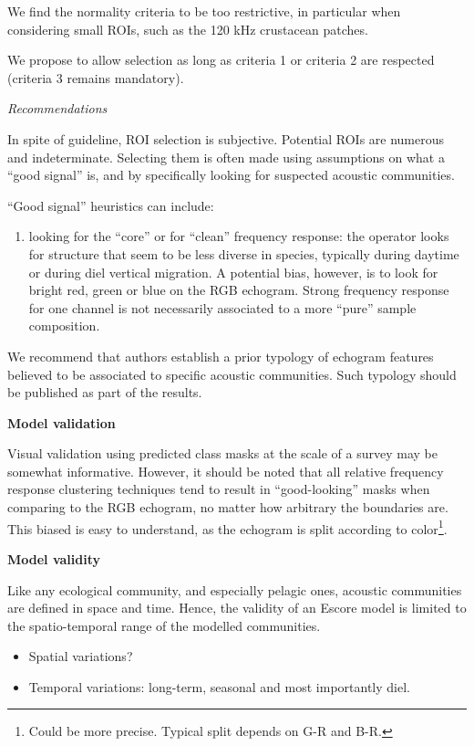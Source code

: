 \documentclass[
  10pt,
  letterpaper,
]{article}
\providecommand{\tightlist}{%
  \setlength{\itemsep}{0pt}\setlength{\parskip}{0pt}}
\begin{document}
We find the normality criteria to be too restrictive, in particular when
considering small ROIs, such as the 120 kHz crustacean patches.

We propose to allow selection as long as criteria 1 or criteria 2 are
respected (criteria 3 remains mandatory).

\emph{Recommendations}

In spite of guideline, ROI selection is subjective. Potential ROIs are
numerous and indeterminate. Selecting them is often made using
assumptions on what a ``good signal'' is, and by specifically looking
for suspected acoustic communities.

``Good signal'' heuristics can include:

\begin{enumerate}
\def\labelenumi{\arabic{enumi}.}
\tightlist
\item
  looking for the ``core'' or for ``clean'' frequency response: the
  operator looks for structure that seem to be less diverse in species,
  typically during daytime or during diel vertical migration. A
  potential bias, however, is to look for bright red, green or blue on
  the RGB echogram. Strong frequency response for one channel is not
  necessarily associated to a more ``pure'' sample composition.
\end{enumerate}

We recommend that authors establish a prior typology of echogram
features believed to be associated to specific acoustic communities.
Such typology should be published as part of the results.

\textbf{Model validation}

Visual validation using predicted class masks at the scale of a survey
may be somewhat informative. However, it should be noted that all
relative frequency response clustering techniques tend to result in
``good-looking'' masks when comparing to the RGB echogram, no matter how
arbitrary the boundaries are. This biased is easy to understand, as the
echogram is split according to color\footnote{Could be more precise.
  Typical split depends on G-R and B-R.}.

\textbf{Model validity}

Like any ecological community, and especially pelagic ones, acoustic
communities are defined in space and time. Hence, the validity of an
Escore model is limited to the spatio-temporal range of the modelled
communities.

\begin{itemize}
\tightlist
\item
  Spatial variations?
\item
  Temporal variations: long-term, seasonal and most importantly diel.
\end{itemize}
\end{document}
